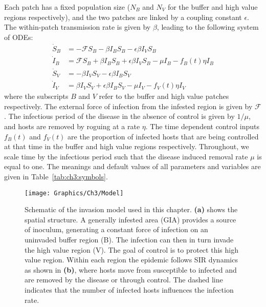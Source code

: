 Each patch has a fixed population size ($N_B$ and $N_V$ for the buffer and high value regions respectively), and the two patches are linked by a coupling constant $\epsilon$. The within-patch transmission rate is given by $\beta$, leading to the following system of ODEs:
\begin{subequations}\label{eqn:ch3:patch_model}
    \begin{align}
        \dot{S}_B &= -\mathcal{F}S_B - \beta{}I_BS_B - \epsilon\beta{}I_VS_B \label{eqn:ch3:patch_model_a}\\
        \dot{I}_B &= \mathcal{F}S_B + \beta{}I_BS_B + \epsilon\beta{}I_VS_B - \mu{}I_B-f_B(t)\eta{}I_B \label{eqn:ch3:patch_model_b}\\
        \dot{S}_V &= -\beta{}I_VS_V - \epsilon\beta{}I_BS_V \label{eqn:ch3:patch_model_c}\\
        \dot{I}_V &= \beta{}I_VS_V + \epsilon\beta{}I_BS_V - \mu{}I_V-f_V(t)\eta{}I_V \label{eqn:ch3:patch_model_d}
    \end{align}
\end{subequations}
where the subscripts $B$ and $V$ refer to the buffer and high value patches respectively. The external force of infection from the infested region is given by $\mathcal{F}$. The infectious period of the disease in the absence of control is given by $1/\mu$, and hosts are removed by roguing at a rate $\eta$. The time dependent control inputs $f_B(t)$ and $f_V(t)$ are the proportion of infected hosts that are being controlled at that time in the buffer and high value regions respectively. Throughout, we scale time by the infectious period such that the disease induced removal rate $\mu$ is equal to one. The meanings and default values of all parameters and variables are given in Table~\ref{tab:ch3:symbols}.

\begin{figure}
    \begin{center}
        \texttt{[image: Graphics/Ch3/Model]}
        \caption[Model schematic]{Schematic of the invasion model used in this chapter. \textbf{(a)} shows the spatial structure. A generally infested area (GIA) provides a source of inoculum, generating a constant force of infection on an uninvaded buffer region (B). The infection can then in turn invade the high value region (V). The goal of control is to protect this high value region. Within each region the epidemic follows SIR dynamics as shown in \textbf{(b)}, where hosts move from susceptible to infected and are removed by the disease or through control. The dashed line indicates that the number of infected hosts influences the infection rate.\label{fig:ch3:model_schematic}}
    \end{center}
\end{figure}

